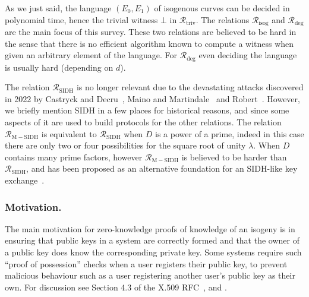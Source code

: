 \documentclass{llncs}
\newcommand{\R}[1][]{\ensuremath{\mathcal{R}_{\mathrm{#1}}}}
\newcommand{\comment}[1]{{\color{gray}#1}}
\newcommand{\CP}[1]{\comment{Christophe: #1}}
\newcommand{\LDF}[1]{\comment{Luca: #1}}
\begin{document}

As we just said, the language $(E_0,E_1)$ of isogenous curves can be decided in polynomial time, hence the trivial witness $\bot$ in \R[triv].
The relations \R[isog] and \R[deg] are the main focus of this survey.
These two relations are believed to be hard in the sense that there is no efficient algorithm known to compute a witness when given an arbitrary element of the language. For $\R[deg]$ even deciding the language is usually hard (depending on $d$).

The relation \R[SIDH] is no longer relevant due to the devastating attacks discovered in 2022 by Castryck and Decru~\cite{CD22}, Maino and Martindale~\cite{MM22} and Robert~\cite{Rob22}. However, we briefly mention SIDH in a few places for historical reasons, and since some aspects of it are used to build protocols for the other relations. The relation \R[M-SIDH] is equivalent to \R[SIDH] when $D$ is a power of a prime, indeed in this case there are only two or four possibilities for the square root of unity $\lambda$. When $D$ contains many prime factors, however \R[M-SIDH] is believed to be harder than \R[SIDH], and has been proposed as an alternative foundation for an SIDH-like key exchange~\cite{cryptoeprint:2023/013}.





\subsubsection{Motivation.}
%
The main motivation for zero-knowledge proofs of knowledge of an isogeny is in ensuring that public keys in a system are correctly formed and that the owner of a public key does know the corresponding private key. Some systems require such ``proof of possession'' checks when a user registers their public key, to prevent malicious behaviour such as a user registering another user's public key as their own. For discussion see Section 4.3 of the X.509 RFC~\cite{X509}, and \cite{BFPW07}. 
\end{document}
